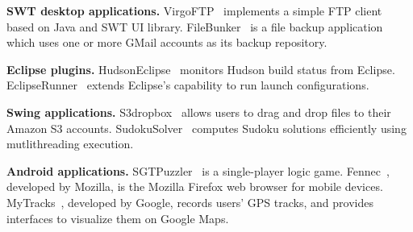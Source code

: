 \begin{itemize}
\Item \textbf{SWT desktop applications.}
VirgoFTP~\cite{virgo} implements a simple FTP client based on Java and SWT UI library.
FileBunker~\cite{filebunker} is a file backup application which uses one or more GMail accounts as its backup repository.

\Item \textbf{Eclipse plugins.}
HudsonEclipse~\cite{hudson} monitors Hudson build status from Eclipse.
EclipseRunner~\cite{eclipserunner} extends Eclipse's capability to run launch configurations.

\Item \textbf{Swing applications.} %
S3dropbox~\cite{s3dropbox}  allows users
to drag and drop files to their Amazon S3 accounts. SudokuSolver~\cite{sudokusolver}
computes Sudoku solutions efficiently using mutlithreading execution. 

\Item  \textbf{Android applications.} %
SGTPuzzler~\cite{sgtpuzzles} is a single-player logic game.
Fennec~\cite{fennec}, developed by Mozilla, is the Mozilla
Firefox web browser for mobile devices. 
MyTracks~\cite{mytracks}, developed by Google, records users' GPS tracks, and provides
interfaces to visualize them on Google Maps. 

\end{itemize}


